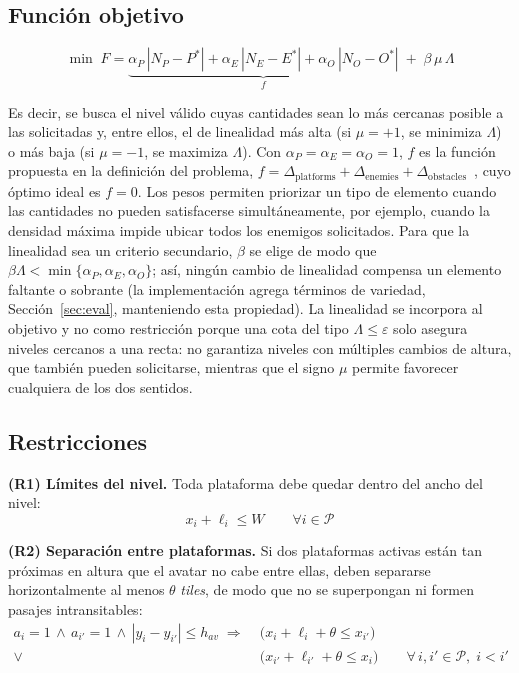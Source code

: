 \documentclass[letter, 10pt]{article}
\begin{document}
\subsection{Funci\'on objetivo}

\begin{equation}
\min\; F = \underbrace{\alpha_P\,\left|N_P - P^*\right| + \alpha_E\,\left|N_E - E^*\right| + \alpha_O\,\left|N_O - O^*\right|}_{f} \;+\; \beta\,\mu\,\Lambda
\end{equation}

Es decir, se busca el nivel v\'alido cuyas cantidades sean lo m\'as cercanas posible a las solicitadas y, entre ellos, el de linealidad m\'as alta (si $\mu = +1$, se minimiza $\Lambda$) o m\'as baja (si $\mu = -1$, se maximiza $\Lambda$). Con $\alpha_P = \alpha_E = \alpha_O = 1$, $f$ es la funci\'on propuesta en la definici\'on del problema, $f = \Delta_{\text{platforms}} + \Delta_{\text{enemies}} + \Delta_{\text{obstacles}}$~\cite{Saavedra2026}, cuyo \'optimo ideal es $f = 0$. Los pesos permiten priorizar un tipo de elemento cuando las cantidades no pueden satisfacerse simult\'aneamente, por ejemplo, cuando la densidad m\'axima impide ubicar todos los enemigos solicitados. Para que la linealidad sea un criterio secundario, $\beta$ se elige de modo que $\beta\Lambda < \min\{\alpha_P, \alpha_E, \alpha_O\}$; as\'i, ning\'un cambio de linealidad compensa un elemento faltante o sobrante (la implementaci\'on agrega t\'erminos de variedad, Secci\'on~\ref{sec:eval}, manteniendo esta propiedad). La linealidad se incorpora al objetivo y no como restricci\'on porque una cota del tipo $\Lambda \leq \varepsilon$ solo asegura niveles cercanos a una recta: no garantiza niveles con m\'ultiples cambios de altura, que tambi\'en pueden solicitarse, mientras que el signo $\mu$ permite favorecer cualquiera de los dos sentidos.

\subsection{Restricciones}

\textbf{(R1) L\'imites del nivel.} Toda plataforma debe quedar dentro del ancho del nivel:
\begin{equation}
x_i + \ell_i \leq W \qquad \forall i \in \mathcal{P}
\end{equation}

\textbf{(R2) Separaci\'on entre plataformas.} Si dos plataformas activas est\'an tan pr\'oximas en altura que el avatar no cabe entre ellas, deben separarse horizontalmente al menos $\theta$ \emph{tiles}, de modo que no se superpongan ni formen pasajes intransitables:
\begin{equation}
\begin{aligned}
a_i = 1 \,\wedge\, a_{i'} = 1 \,\wedge\, |y_i - y_{i'}| \leq h_{av} \;\Rightarrow\; &\big(x_i + \ell_i + \theta \leq x_{i'}\big) \\
\vee\; &\big(x_{i'} + \ell_{i'} + \theta \leq x_i\big) \qquad \forall\, i, i' \in \mathcal{P},\; i < i'
\end{aligned}
\end{equation}
\end{document}
